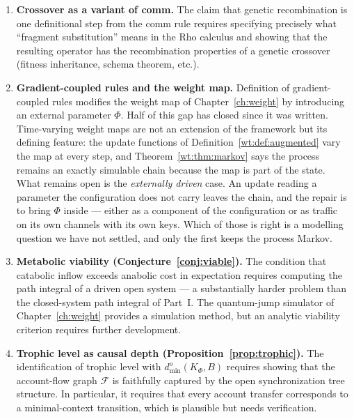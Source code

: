 \begin{enumerate}[label=\textbf{Gap \arabic*.}, leftmargin=*, itemsep=8pt]
  \item \textbf{Crossover as a variant of comm.}
        The claim that genetic recombination is one definitional
        step from the comm rule requires specifying precisely what
        ``fragment substitution'' means in the Rho calculus and
        showing that the resulting operator has the recombination
        properties of a genetic crossover (fitness inheritance,
        schema theorem, etc.).

  \item \textbf{Gradient-coupled rules and the weight map.}
        Definition of gradient-coupled rules modifies the weight
        map of Chapter~\ref{ch:weight} by introducing an external
        parameter $\Phi$.
        Half of this gap has closed since it was written.
        Time-varying weight maps are not an extension of the
        framework but its defining feature: the update functions of
        Definition~\ref{wt:def:augmented} vary the map at every
        step, and Theorem~\ref{wt:thm:markov} says the process
        remains an exactly simulable chain because the map is part
        of the state.
        What remains open is the \emph{externally driven} case.
        An update reading a parameter the configuration does not
        carry leaves the chain, and the repair is to bring $\Phi$
        inside --- either as a component of the configuration or as
        traffic on its own channels with its own keys.
        Which of those is right is a modelling question we have not
        settled, and only the first keeps the process Markov.

  \item \textbf{Metabolic viability (Conjecture~\ref{conj:viable}).}
        The condition that catabolic inflow exceeds anabolic cost
        in expectation requires computing the path integral of a
        driven open system --- a substantially harder problem than
        the closed-system path integral of Part~I.
        The quantum-jump simulator of Chapter~\ref{ch:weight}
        provides a simulation method, but an analytic viability
        criterion requires further development.

  \item \textbf{Trophic level as causal depth
        (Proposition~\ref{prop:trophic}).}
        The identification of trophic level with
        $d^o_{\min}(K_\Phi, B)$ requires showing that the
        account-flow graph $\mathcal{F}$ is faithfully captured
        by the open synchronization tree structure.
        In particular, it requires that every account transfer
        corresponds to a minimal-context transition, which is
        plausible but needs verification.


\end{enumerate}
